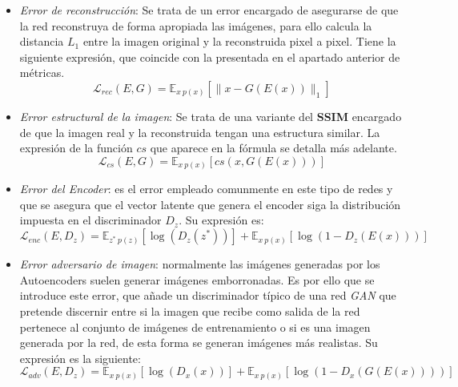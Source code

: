             \begin{itemize}
                \item \textit{Error de reconstrucción}: Se trata de un error encargado de asegurarse de que la red reconstruya de forma apropiada las imágenes, para ello calcula la distancia $L_1$ entre la imagen original y la reconstruida pixel a pixel. Tiene la siguiente expresión, que coincide con la presentada en el apartado anterior de métricas.
                \begin{equation*}
                    \mathcal{L}_{rec}(E,G)= \mathbb{E}_{x~p(x)}\left[\|x- G(E(x)) \|_1\right]
                \end{equation*}
                \item \textit{Error estructural de la imagen}: Se trata de una variante del \textbf{SSIM} encargado de que la imagen real y la reconstruida tengan una estructura similar. La expresión de la función $cs$ que aparece en la fórmula se detalla más adelante.
                \begin{equation*}
                    \mathcal{L}_{cs}(E,G)= \mathbb{E}_{x~p(x)}\left[cs(x, G(E(x)))\right]
                \end{equation*}
                \item \textit{Error del Encoder}: es el error empleado comunmente en este tipo de redes y que se asegura que el vector latente que genera el encoder siga la distribución impuesta en el discriminador $D_z$. Su expresión es:
                \begin{equation*}
                    \mathcal{L}_{enc}(E,D_z)=\mathbb{E}_{z^*~p(z)}[\log(D_z(z^*))] + \mathbb{E}_{x~p(x)}[\log(1-D_z(E(x)))]
                \end{equation*}
                \item \textit{Error adversario de imagen}: normalmente las imágenes generadas por los Autoencoders suelen generar imágenes emborronadas. Es por ello que se introduce este error, que añade un discriminador típico de una red \textit{GAN} que pretende discernir entre si la imagen que recibe como salida de la red pertenece al conjunto de imágenes de entrenamiento o si es una imagen generada por la red, de esta forma se generan imágenes más realistas. Su expresión es la siguiente: 
                \begin{equation*}
                    \mathcal{L}_{adv}(E,D_z)=\mathbb{E}_{x~p(x)}[\log(D_x(x))] + \mathbb{E}_{x~p(x)}[\log(1-D_x(G(E(x))))]
                \end{equation*}
            \end{itemize}

